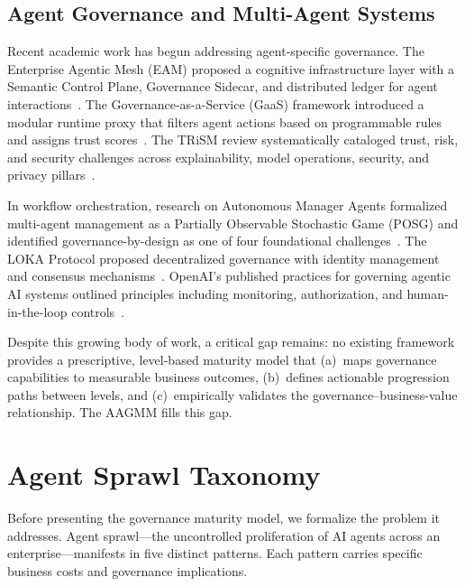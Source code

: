 \documentclass[ai,article,submit,pdftex,moreauthors]{Definitions/mdpi}
\begin{document}
\subsection{Agent Governance and Multi-Agent Systems}\label{sec:related-agent}

Recent academic work has begun addressing agent-specific governance. The Enterprise Agentic Mesh (EAM) proposed a cognitive infrastructure layer with a Semantic Control Plane, Governance Sidecar, and distributed ledger for agent interactions~\cite{gupta2025eam}. The Governance-as-a-Service (GaaS) framework introduced a modular runtime proxy that filters agent actions based on programmable rules and assigns trust scores~\cite{fernandez2025gaas}. The TRiSM review systematically cataloged trust, risk, and security challenges across explainability, model operations, security, and privacy pillars~\cite{ray2025trism}.

In workflow orchestration, research on Autonomous Manager Agents formalized multi-agent management as a Partially Observable Stochastic Game (POSG) and identified governance-by-design as one of four foundational challenges~\cite{chen2025manageragent}. The LOKA Protocol proposed decentralized governance with identity management and consensus mechanisms~\cite{ranjan2025loka}. OpenAI's published practices for governing agentic AI systems outlined principles including monitoring, authorization, and human-in-the-loop controls~\cite{openai2025practices}.

Despite this growing body of work, a critical gap remains: no existing framework provides a prescriptive, level-based maturity model that (a)~maps governance capabilities to measurable business outcomes, (b)~defines actionable progression paths between levels, and (c)~empirically validates the governance--business-value relationship. The AAGMM fills this gap.


\section{Agent Sprawl Taxonomy}\label{sec:taxonomy}

Before presenting the governance maturity model, we formalize the problem it addresses. Agent sprawl---the uncontrolled proliferation of AI agents across an enterprise---manifests in five distinct patterns. Each pattern carries specific business costs and governance implications.
\end{document}
